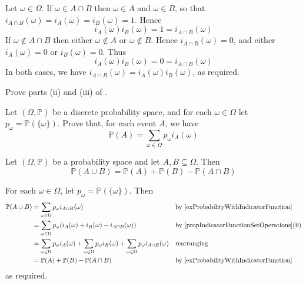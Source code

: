 \begin{cproof}[of (i)]
Let $\omega \in \Omega$. If $\omega \in A \cap B$ then $\omega \in A$ and $\omega \in B$, so that $i_{A \cap B}(\omega) = i_A(\omega) = i_B(\omega) = 1$. Hence
\[ i_A(\omega)i_B(\omega) = 1 = i_{A \cap B}(\omega) \]
If $\omega \not \in A \cap B$ then either $\omega \not \in A$ or $\omega \not \in B$. Hence $i_{A \cap B}(\omega) = 0$, and either $i_A(\omega) = 0$ or $i_B(\omega) = 0$. Thus
\[ i_A(\omega) i_B(\omega) = 0 = i_{A \cap B}(\omega) \]
In both cases, we have $i_{A \cap B}(\omega) = i_A(\omega)i_B(\omega)$, as required.
\end{cproof}

\begin{exercise}
Prove parts (ii) and (iii) of .
\end{exercise}

\begin{exercise}
\label{exProbabilityWithIndicatorFunction}
Let $(\Omega, \mathbb{P})$ be a discrete probability space, and for each $\omega \in \Omega$ let $p_{\omega} = \mathbb{P}(\{\omega\})$. Prove that, for each event $A$, we have
\[ \mathbb{P}(A) = \sum_{\omega \in \Omega} p_{\omega}i_A(\omega) \]
\end{exercise}

\begin{theorem}
\label{thmProbabilityOfUnion}
Let $(\Omega,\mathbb{P})$ be a probability space and let $A,B \subseteq \Omega$. Then
\[ \mathbb{P}(A \cup B) = \mathbb{P}(A) + \mathbb{P}(B) - \mathbb{P}(A \cap B) \]
\end{theorem}

\begin{cproof}
For each $\omega \in \Omega$, let $p_{\omega} = \mathbb{P}(\{\omega\})$. Then
\begin{align*}
\mathbb{P}(A \cup B) &= \sum_{\omega \in \Omega} p_{\omega}i_{A \cup B}(\omega) && \text{by \Cref{exProbabilityWithIndicatorFunction}} \\
&= \sum_{\omega \in \Omega} p_{\omega}(i_A(\omega)+i_B(\omega)-i_{A \cap B}(\omega)) && \text{by \Cref{propIndicatorFunctionSetOperations}(ii)} \\
&= \sum_{\omega \in \Omega} p_{\omega}i_A(\omega) + \sum_{\omega \in \Omega} p_{\omega}i_B(\omega) + \sum_{\omega \in \Omega} p_{\omega}i_{A \cap B}(\omega) && \text{rearranging} \\
&= \mathbb{P}(A) + \mathbb{P}(B) - \mathbb{P}(A \cap B) && \text{by \Cref{exProbabilityWithIndicatorFunction}}
\end{align*}
as required.
\end{cproof}


